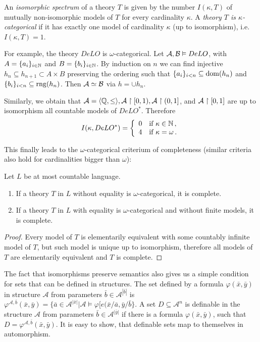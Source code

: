 An \emph{isomorphic spectrum} of a theory $T$ is given by the number $I(\kappa, T)$ of mutually non-isomorphic models of $T$ for every cardinality $\kappa$. A \emph{theory $T$ is $\kappa$-categorical} if it has exactly one model of cardinality $\kappa$ (up to isomorphism), i.e. $I(\kappa, T) = 1$. 

For example, the theory $DeLO$ is $\omega$-categorical. Let $\mathcal{A}, \mathcal{B} \vDash DeLO$, with $A = \{a_i\}_{i \in \mathbb{N}}$ and $B = \{b_i\}_{i \in \mathbb{N}}$. By induction on $n$ we can find injective $h_n \subseteq h_{n+1} \subset A \times B$ preserving the ordering such that $\{a_i\}_{i < n} \subseteq \operatorname{dom}(h_n)$ and $\{b_i\}_{i<n} \subseteq \operatorname{rng}(h_n)$. Then $\mathcal{A} \simeq \mathcal{B}$ via $h = \cup h_n$.

Similarly, we obtain that $\mathcal{A} = \langle \mathbb{Q}, \leq \rangle, \mathcal{A} \upharpoonright [0, 1), \mathcal{A} \upharpoonright (0, 1]$, and $\mathcal{A} \upharpoonright [0, 1]$ are up to isomorphism all countable models of $DeLO^*$. Therefore $$I(\kappa, DeLO^*) = \left\{ \begin{array}{ll} 0 & \text{if } \kappa \in \mathbb{N}\,, \\ 4 & \text{if } \kappa = \omega\,. \end{array} \right.$$

This finally leads to the $\omega$-categorical criterium of completeness (similar criteria also hold for cardinalities bigger than $\omega$):

\begin{theorem}
Let $L$ be at most countable language.
\begin{enumerate}
	\item If a theory $T$ in $L$ without equality is $\omega$-categorical, it is complete.
	\item If a theory $T$ in $L$ with equality is $\omega$-categorical and without finite models, it is complete.
\end{enumerate}
\end{theorem}
\begin{proof}
Every model of $T$ is elementarily equivalent with some countably infinite model of $T$, but such model is unique up to isomorphism, therefore all models of $T$ are elementarily equivalent and $T$ is complete.
\end{proof}

The fact that isomorphisms preserve semantics also gives us a simple condition for sets that can be defined in structures. The set defined by a formula $\varphi(\bar{x}, \bar{y})$ in structure $\mathcal{A}$ from parameters $\bar{b}\in \mathcal{A}^{|\bar{b}|}$ is $\varphi^{\mathcal{A}, \bar{b}}(\bar{x}, \bar{y}) = \{\bar{a} \in \mathcal{A}^{|\bar{x}|} | \mathcal{A} \vDash \varphi[e(\bar{x}/\bar{a}, \bar{y}/\bar{b}\}$. A set $D \subseteq \mathcal{A}^n$ is definable in the structure $\mathcal{A}$ from parameters $\bar{b} \in \mathcal{A}^{|\bar{y}|}$ if there is a formula $\varphi(\bar{x}, \bar{y})$, such that $D = \varphi^{\mathcal{A}, \bar{b}}(\bar{x}, \bar{y})$. It is easy to show, that definable sets map to themselves in automorphism. 

